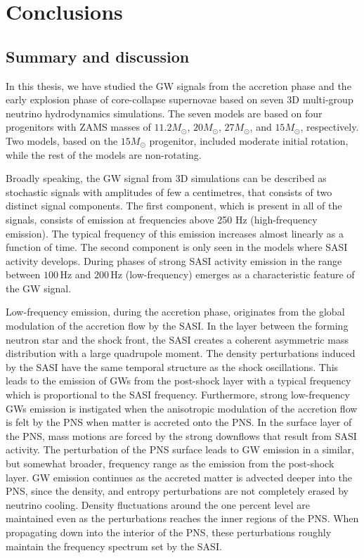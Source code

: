\chapter{Conclusions}
\section{Summary and discussion}
In this thesis, we have studied the GW signals from the accretion phase and the early
explosion phase of core-collapse supernovae based on seven 3D
multi-group neutrino hydrodynamics simulations. The seven models are based on four progenitors
with ZAMS masses of $11.2 M_\odot$, $20 M_\odot$, $27 M_\odot$, and $15 M_\odot$, respectively.
Two models, based on the $15 M_\odot$ progenitor, included moderate initial rotation, while the
rest of the models are non-rotating.

Broadly speaking, the GW signal from 3D simulations can be described as stochastic signals with 
amplitudes of few a centimetres, that consists of two distinct signal components.
The first component, which is present in all of the signals, consists of emission at frequencies
above 250 Hz (high-frequency emission). The typical frequency of this emission increases almost 
linearly as a function of time. The second component is only seen in the models where
SASI activity develops. During phases of strong SASI activity 
emission in the range between $100 \, \mathrm{Hz}$ and $200 \, \mathrm{Hz}$ (low-frequency) 
emerges as a characteristic feature of the GW signal.

Low-frequency emission, during the accretion phase, 
originates from the global modulation of the accretion flow by the SASI.
In the layer between the forming neutron star and the shock front, the SASI creates a coherent
asymmetric mass distribution with a large quadrupole moment. The density perturbations induced
by the SASI have the same temporal structure
as the shock oscillations. This leads to the emission of GWs from the post-shock layer with a typical frequency which is proportional to the SASI frequency. 
Furthermore, strong low-frequency GWs emission is instigated when the anisotropic modulation of the accretion flow is felt by the PNS when matter is accreted onto the PNS. 
In the surface layer of the PNS, mass motions are forced by the strong downflows that result from SASI activity. The perturbation of the PNS surface leads to
GW emission in a similar, but somewhat broader, frequency range as the emission from the
post-shock layer. GW emission continues as the accreted matter is advected deeper into the 
PNS, since the density, and entropy perturbations are not
completely erased by neutrino cooling. Density fluctuations around the one percent level
are maintained even as the perturbations reaches the inner regions of the PNS. When propagating down into the interior of the PNS, these perturbations roughly maintain the frequency spectrum set by the SASI.

